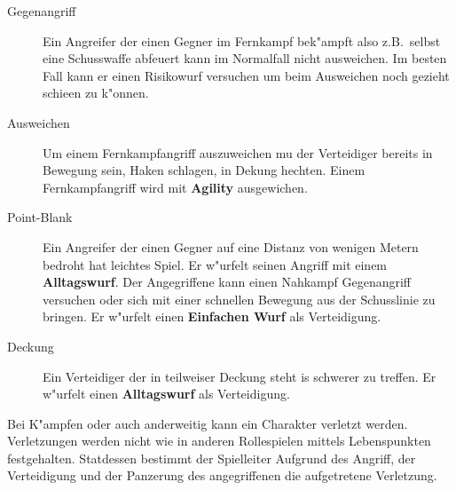 \begin{description}
    \item[Gegenangriff] Ein Angreifer der einen Gegner im Fernkampf bek"ampft also z.B.~selbst eine Schusswaffe abfeuert kann im Normalfall 
        nicht ausweichen. Im besten Fall kann er einen Risikowurf versuchen um beim Ausweichen noch gezieht schie\3en zu k"onnen.
    \item[Ausweichen] Um einem Fernkampfangriff auszuweichen mu\3 der Verteidiger bereits in Bewegung sein, Haken schlagen, in Dekung 
        hechten. Einem Fernkampfangriff wird mit \textbf{Agility} ausgewichen. 
    \item[Point-Blank] Ein Angreifer der einen Gegner auf eine Distanz von wenigen Metern bedroht hat leichtes 
        Spiel. Er w"urfelt seinen Angriff mit einem \textbf{Alltagswurf}. Der Angegriffene kann einen Nahkampf Gegenangriff versuchen oder sich mit einer schnellen Bewegung aus der Schusslinie zu bringen. Er w"urfelt einen \textbf{Einfachen Wurf} als Verteidigung.
    \item[Deckung] Ein Verteidiger der in teilweiser Deckung steht is schwerer zu treffen. Er w"urfelt einen \textbf{Alltagswurf} als 
        Verteidigung.
\end{description}

Bei K"ampfen oder auch anderweitig kann ein Charakter verletzt werden. Verletzungen werden nicht wie in anderen Rollespielen mittels Lebenspunkten festgehalten. Statdessen bestimmt der Spielleiter Aufgrund des Angriff, der Verteidigung und der Panzerung des angegriffenen die aufgetretene Verletzung. 

